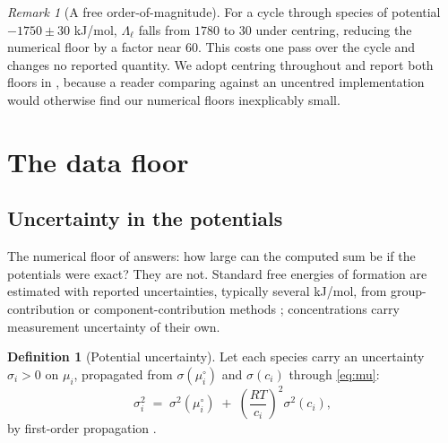 \documentclass[11pt,twocolumn,a4paper]{article}
\theoremstyle{pstyle}
\theoremstyle{definition}
\newtheorem{definition}[theorem]{Definition}
\theoremstyle{remark}
\newtheorem{remark}[theorem]{Remark}
\begin{document}
\begin{remark}[A free order-of-magnitude]
\label{rem:gauge-gain}
For a cycle through species of potential $-1750\pm 30$ kJ/mol,
$\Lambda_\ell$ falls from $1780$ to $30$ under centring, reducing the
numerical floor by a factor near $60$. This costs one pass over the
cycle and changes no reported quantity. We adopt centring throughout and
report both floors in , because a reader comparing
against an uncentred implementation would otherwise find our numerical
floors inexplicably small.
\end{remark}

\section{The data floor}
\label{sec:data-floor}

\subsection{Uncertainty in the potentials}

The numerical floor of  answers: how large can
the computed sum be if the potentials were exact? They are not.
Standard free energies of formation are estimated with reported
uncertainties, typically several kJ/mol, from group-contribution or
component-contribution methods \citep{alberty1998,noor2013,
flamholz2012}; concentrations carry measurement uncertainty of their
own.

\begin{definition}[Potential uncertainty]
\label{def:sigma}
Let each species carry an uncertainty $\sigma_i>0$ on $\mu_i$,
propagated from $\sigma(\mu_i^{\circ})$ and $\sigma(c_i)$ through
\eqref{eq:mu}:
\begin{equation}
  \sigma_i^{2} \;=\; \sigma^{2}(\mu_i^{\circ})
  \;+\; \left(\frac{RT}{c_i}\right)^{2}\sigma^{2}(c_i),
  \label{eq:sigma-prop}
\end{equation}
by first-order propagation \citep{gum2008}.
\end{definition}
\end{document}

